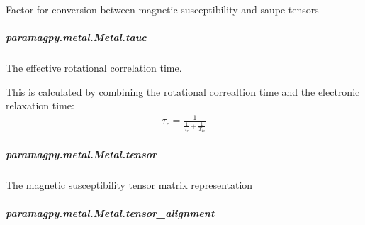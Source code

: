 \documentclass[a4paper,10pt,english,openany,oneside]{sphinxmanual}
\begin{document}
\begin{fulllineitems}
\begin{fulllineitems}
\begin{fulllineitems}
\label{\detokenize{reference/generated/paramagpy.metal.Metal.saupe_factor:paramagpy.metal.Metal.saupe_factor}}
Factor for conversion between magnetic susceptibility
and saupe tensors

\end{fulllineitems}



\subparagraph{paramagpy.metal.Metal.tauc}
\label{\detokenize{reference/generated/paramagpy.metal.Metal.tauc:paramagpy-metal-metal-tauc}}\label{\detokenize{reference/generated/paramagpy.metal.Metal.tauc::doc}}

\begin{fulllineitems}
\label{\detokenize{reference/generated/paramagpy.metal.Metal.tauc:paramagpy.metal.Metal.tauc}}
The effective rotational correlation time.

This is calculated by combining the rotational correaltion time
and the electronic relaxation time:
\begin{equation*}
\begin{split}\tau_c = \frac{1}{\frac{1}{\tau_r}+\frac{1}{T_{1e}}}\end{split}
\end{equation*}
\end{fulllineitems}



\subparagraph{paramagpy.metal.Metal.tensor}
\label{\detokenize{reference/generated/paramagpy.metal.Metal.tensor:paramagpy-metal-metal-tensor}}\label{\detokenize{reference/generated/paramagpy.metal.Metal.tensor::doc}}

\begin{fulllineitems}
\label{\detokenize{reference/generated/paramagpy.metal.Metal.tensor:paramagpy.metal.Metal.tensor}}
The magnetic susceptibility tensor matrix representation

\end{fulllineitems}



\subparagraph{paramagpy.metal.Metal.tensor\_alignment}
\label{\detokenize{reference/generated/paramagpy.metal.Metal.tensor_alignment:paramagpy-metal-metal-tensor-alignment}}\label{\detokenize{reference/generated/paramagpy.metal.Metal.tensor_alignment::doc}}


\end{fulllineitems}
\end{fulllineitems}
\end{document}
